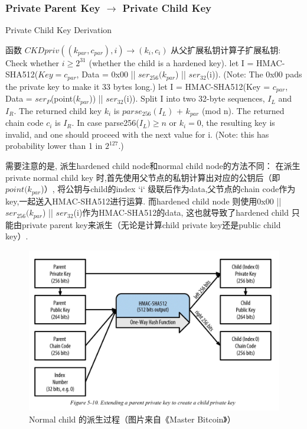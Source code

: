 \subsubsection{Private Parent Key $\rightarrow$ Private Child Key}
 
\begin{algorithm}[tbp]\footnotesize
\caption{Private Child Key Derivation}
  	\begin{algorithmic}[1]
	    \STATE 函数 $CKDpriv((k_{par}, c_{par}), i) \rightarrow (k_i, c_i)$ 从父扩展私钥计算子扩展私钥:
		\STATE Check whether $i \geq 2^{31}$ (whether the child is a hardened key).  
			\STATE let I = HMAC-SHA512($Key = c_{par}$, Data = 0x00 || 
			$ser_{256}(k_{par}$) || $ser_{32}$(i)). (Note: The 0x00 pads 
			the private key to make it 33 bytes long.)  
		\ELSE
			\STATE let I = HMAC-SHA512(Key = $c_{par}$, 
			Data = $ser_P$(point($k_{par}$)) || $ser_{32}$(i)).  
		\ENDIF
		\STATE Split I into two 32-byte sequences, $I_L$ and $I_R$.
		\STATE The returned child key $k_i$ is $parse_{256}(I_L)$ + $k_{par}$ (mod n).
		\STATE The returned chain code $c_i$ is $I_R$.  
		\STATE In case parse256($I_L) \geq n$ or $k_i = 0$, the resulting key is invalid, 
		and one should proceed with the next value for i. 
		(Note: this has probability lower than 1 in $2^{127}$.)  
    \end{algorithmic}
\end{algorithm}

需要注意的是, 派生hardened child node和normal child node的方法不同：
在派生private normal child key 时,首先使用父节点的私钥计算出对应的公钥后（即$point(k_{par}$)）,
将公钥与child的index `i` 级联后作为data,父节点的chain code作为key,一起送入HMAC-SHA512进行运算.
而hardened child node 则使用0x00 || $ser_{256}(k_{par}$) || $ser_{32}$(i)作为HMAC-SHA512的data,
这也就导致了hardened child 只能由private parent key来派生（无论是计算child private key还是public child key）.

\begin{figure}[h]
\centering
\includegraphics[width=.7\textwidth]{./CKDpriv.png}
\caption{Normal child 的派生过程（图片来自《Master Bitcoin》）}\label{fig-parsesig}
\end{figure}


